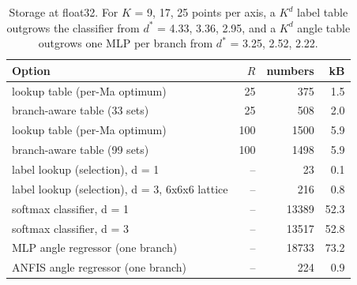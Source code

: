 \begin{table}[!t]
\centering
\caption{Storage at float32. For $K$ = 9, 17, 25 points per axis, a $K^d$ label table outgrows the classifier from $d^\ast$ = 4.33, 3.36, 2.95, and a $K^d$ angle table outgrows one MLP per branch from $d^\ast$ = 3.25, 2.52, 2.22.}
\label{tab:cost}
\footnotesize
\setlength{\tabcolsep}{4pt}
\begin{tabular}{p{}rrr}
\toprule
Option & $R$ & numbers & kB \\
\midrule
lookup table (per-Ma optimum) & 25 & 375 & 1.5 \\
branch-aware table (33 sets) & 25 & 508 & 2.0 \\
lookup table (per-Ma optimum) & 100 & 1500 & 5.9 \\
branch-aware table (99 sets) & 100 & 1498 & 5.9 \\
label lookup (selection), d = 1 & -- & 23 & 0.1 \\
label lookup (selection), d = 3, 6x6x6 lattice & -- & 216 & 0.8 \\
softmax classifier, d = 1 & -- & 13389 & 52.3 \\
softmax classifier, d = 3 & -- & 13517 & 52.8 \\
MLP angle regressor (one branch) & -- & 18733 & 73.2 \\
ANFIS angle regressor (one branch) & -- & 224 & 0.9 \\
\bottomrule
\end{tabular}
\end{table}
